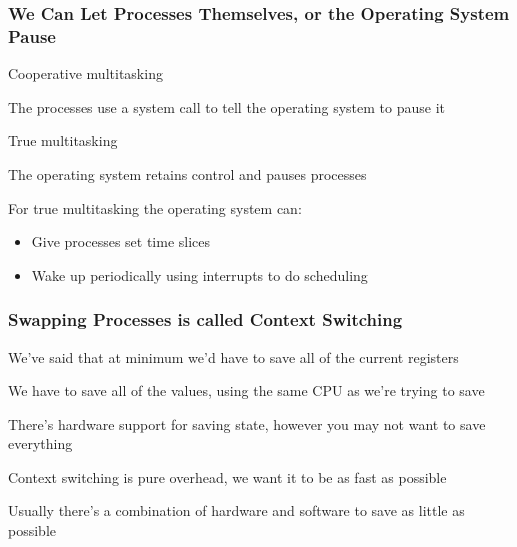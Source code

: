   \begin{frame}
    \frametitle{We Can Let Processes Themselves, or the Operating System Pause}
    
    Cooperative multitasking

    \hspace{2em} The processes use a system call to tell the operating system to
    pause it

    \vspace{2em}

    True multitasking

    \hspace{2em} The operating system retains control and pauses processes

    \vspace{4em}

    For true multitasking the operating system can:

    \begin{itemize}
      \item Give processes set time slices
      \item Wake up periodically using interrupts to do scheduling
    \end{itemize}
  \end{frame}

  \begin{frame}
    \frametitle{Swapping Processes is called Context Switching}

    We've said that at minimum we'd have to save all of the current registers

    \hspace{2em} We have to save all of the values, using the same CPU as we're
    trying to save

    \vspace{2em}

    There's hardware support for saving state, however you may not want to save
    everything

    \vspace{2em}

    Context switching is pure overhead, we want it to be as fast as possible


    \vspace{4em}

    Usually there's a combination of hardware and software to save as little as
    possible
  \end{frame}

